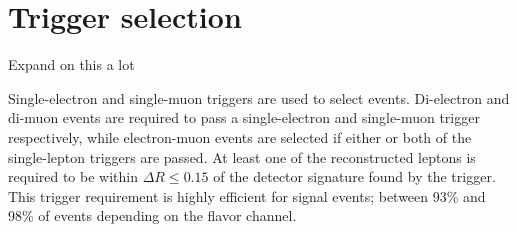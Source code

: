\section{Trigger selection}
\label{sec:trigger_selection}

{\color{red} Expand on this a lot}

Single-electron and single-muon triggers are used to select events. 
Di-electron and di-muon events are required to pass a single-electron and
single-muon trigger respectively, while electron-muon events are selected if
either or both of the single-lepton triggers are passed.
At least one of the reconstructed leptons is required to be
within $\Delta R \leq 0.15$ of the detector signature found by the trigger.
This trigger requirement is highly efficient for signal events; between 93\%
and 98\% of events depending on the flavor channel.

\begin{table}[ht]
    \caption{Requirements for the triggers used in this analysis.  }
    \label{tab:trigger_defs}
\end{table}

